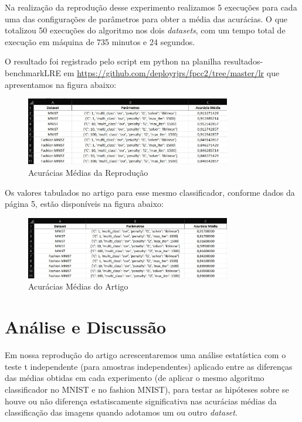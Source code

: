 \documentclass{article}
\begin{document}
Na realização da reprodução desse experimento realizamos 5 execuções para cada uma das configurações de parâmetros para obter a média das acurácias. O que totalizou 50 execuções do algoritmo nos dois \textit{datasets}, com um tempo total de execução em máquina de 735 minutos e 24 segundos.

O resultado foi registrado pelo script em python na planilha resultados-benchmarkLRE em \url{https://github.com/deployrjrs/fpcc2/tree/master/lr} que apresentamos na figura abaixo:
\begin{figure}[H]
    \centering
    \includegraphics[width=0.8\textwidth]{lrplan01.jpg}
    \caption{Acurácias Médias da Reprodução}
    \label{fig:planlr1}
\end{figure}

Os valores tabulados no artigo para esse mesmo classificador, conforme dados da página 5, estão disponíveis na figura abaixo:
\begin{figure}[H]
    \centering
    \includegraphics[width=0.8\textwidth]{lrplan02.jpg}
    \caption{Acurácias Médias do Artigo}
    \label{fig:planlr2}
\end{figure}

\section{Análise e Discussão}

Em nossa reprodução do artigo acrescentaremos uma análise estatística com o teste t independente (para amostras independentes) aplicado entre as diferenças das médias obtidas em cada experimento (de aplicar o mesmo algoritmo classificador no MNIST e no 
fashion MNIST), para testar as hipóteses sobre se houve ou não diferença estatiscamente significativa nas acurácias médias da classificação das imagens quando adotamos um ou outro \textit{dataset}.
\end{document}
